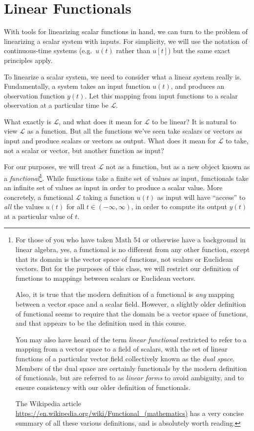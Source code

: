 \documentclass[letterpaper]{article}
\theoremstyle{remark}
\begin{document}
\section{Linear Functionals}
With tools for linearizing scalar functions in hand, we can turn to the problem of linearizing a scalar system with inputs. For simplicity, we will use the notation of continuous-time systems (e.g.\ $u(t)$ rather than $u[t]$) but the same exact principles apply.

To linearize a scalar system, we need to consider what a linear system really is. Fundamentally, a system takes an input function $u(t)$, and produces an observation function $y(t)$. Let this mapping from input functions to a scalar observation at a particular time be $\mathcal{L}$. 

What exactly is $\mathcal{L}$, and what does it mean for $\mathcal{L}$ to be linear? It is natural to view $\mathcal{L}$ as a function. But all the functions we've seen take scalars or vectors as input and produce scalars or vectors as output. What does it mean for $\mathcal{L}$ to take, not a scalar or vector, but another function as input?

For our purposes, we will treat $\mathcal{L}$ not as a function, but as a new object known as a \emph{functional}\footnote{For those of you who have taken Math 54 or otherwise have a background in linear algebra, yes, a functional is no different from any other function, except that its domain is the vector space of functions, not scalars or Euclidean vectors. But for the purposes of this class, we will restrict our definition of functions to mappings between scalars or Euclidean vectors. 

Also, it is true that the modern definition of a functional is \emph{any} mapping between a vector space and a scalar field. However, a slightly older definition of functional seems to require that the domain be a vector space of functions, and that appears to be the definition used in this course. 

You may also have heard of the term \emph{linear functional} restricted to refer to a mapping from a vector space to a field of scalars, with the set of linear functions of a particular vector field collectively known as the \emph{dual space}. Members of the dual space are certainly functionals by the modern definition of functionals, but are referred to as \emph{linear forms} to avoid ambiguity, and to ensure consistency with our older definition of functionals.

The Wikipedia article \url{https://en.wikipedia.org/wiki/Functional_(mathematics)} has a very concise summary of all these various definitions, and is absolutely worth reading.}. While functions take a finite set of values as input, functionals take an infinite set of values as input in order to produce a scalar value. More concretely, a functional $\mathcal{L}$ taking a function $u(t)$ as input will have ``access'' to \emph{all} the values $u(t)$ for all $t \in (-\infty, \infty)$, in order to compute its output $y(t)$ at a particular value of $t$.
\end{document}

